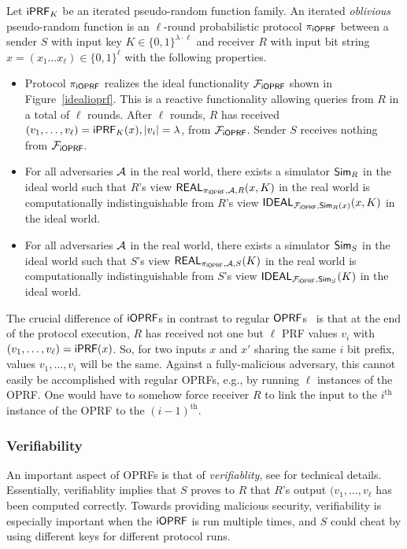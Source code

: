 \begin{definition}[$\proto$]
  Let $\mathsf{i}\mathsf{PRF}_K$ be an iterated pseudo-random function family.  An
  iterated \emph{oblivious} pseudo-random function is an $\ell$-round
  probabilistic protocol $\proto$ between a sender $S$ with input key
  $K\in\{0,1\}^{\lambda\cdot\ell}$ and receiver $R$ with input bit
  string $x=(x_1\ldots{}x_\ell)\in\{0,1\}^{\ell}$ with the following
  properties.

  \begin{itemize}
   
  \item Protocol $\proto$ realizes the ideal functionality $\mathcal{F}_{\mathsf{i}\mathsf{OPRF}}$
    shown in Figure~\ref{idealioprf}. This is a reactive functionality
    allowing queries from $R$ in a total of $\ell$ rounds.  After
    $\ell$ rounds, $R$ has received
    $(v_1,\ldots,v_\ell)=\mathsf{i}\mathsf{PRF}_K(x),|v_i|=\lambda$, from
    $\mathcal{F}_{\mathsf{i}\mathsf{OPRF}}$. Sender $S$ receives nothing from $\mathcal{F}_{\mathsf{i}\mathsf{OPRF}}$.
  
  \item For all adversaries ${\mathcal{A}}$ in the real world, there exists a
    simulator ${\mathsf{Sim}}_R$ in the ideal world such that $R$'s view
    $\mathsf{REAL}_{{\pi_{\mathsf{i}\mathsf{OPRF}}},{\mathcal{A}},R}(x,K)$ in the real world is
    computationally indistinguishable from $R$'s view
    $\mathsf{IDEAL}_{\mathcal{F}_{\mathsf{i}\mathsf{OPRF}},{\mathsf{Sim}}_R(x)}(x,K)$ in the ideal world.

  \item For all adversaries ${\mathcal{A}}$ in the real world, there exists a
    simulator ${\mathsf{Sim}}_S$ in the ideal world such that $S$'s view
    $\mathsf{REAL}_{{\pi_{\mathsf{i}\mathsf{OPRF}}},{\mathcal{A}},S}(K)$ in the real world is
    computationally indistinguishable from $S$'s view
    $\mathsf{IDEAL}_{\mathcal{F}_{\mathsf{i}\mathsf{OPRF}},{\mathsf{Sim}}_S}(K)$ in the ideal world.
\end{itemize}
\end{definition}

The crucial difference of $\mathsf{i}\mathsf{OPRF}$s in contrast to regular
$\mathsf{OPRF}$s~\cite{oprf,stan,chase,koles,boneh,kia} is that at the end of
the protocol execution, $R$ has received not one but $\ell$ PRF values
$v_i$ with $(v_1,\ldots,v_\ell)=\mathsf{i}\mathsf{PRF}(x)$. So, for two inputs $x$ and
$x'$ sharing the same $i$ bit prefix, values $v_1,\ldots,v_i$ will be
the same. Against a fully-malicious adversary, this cannot easily be
accomplished with regular OPRFs, e.g., by running $\ell$ instances of
the OPRF. One would have to somehow force receiver $R$ to link the
input to the $i^\text{th}$ instance of the OPRF to the
$(i-1)^\text{th}$.

\subsubsection{Verifiability}
An important aspect of OPRFs is that of \emph{verifiablity}, see
\citet{kia} for technical details. Essentially, verifiablity implies
that $S$ proves to $R$ that $R$'s output $(v_1,\ldots,v_\ell$ has been
computed correctly. Towards providing malicious security,
verifiability is especially important when the $\mathsf{i}\mathsf{OPRF}$ is run
multiple times, and $S$ could cheat by using different keys for
different protocol runs.

